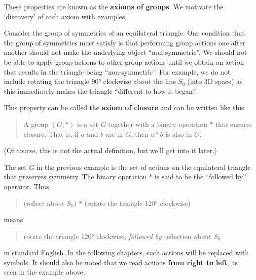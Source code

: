 These properties are known as the \textbf{axioms of groups}. We motivate the `discovery' of each axiom with examples.

\begin{figure}
    \centering
\end{figure}

Consider the group of symmetries of an equilateral triangle. One condition that the group of symmetries must satisfy is that performing group actions one after another should not make the underlying object ``non-symmetric''. We should not be able to apply group actions to other group actions until we obtain an action that results in the triangle being ``non-symmetric''. For example, we do not include rotating the triangle 90° clockwise about the line $S_0$ (into 3D space) as this immediately makes the triangle ``different to how it began''.

This property can be called the \textbf{axiom of closure} and can be written like this:
\begin{quote}
    A group $(G, \ast)$ is a set $G$ together with a binary operation $\ast$ that ensures closure. That is, if $a$ and $b$ are in $G$, then $a \ast b$ is also in $G$.
\end{quote}
(Of course, this is not the actual definition, but we'll get into it later.)

\newpage

The set $G$ in the previous example is the set of actions on the equilateral triangle that preserves symmetry. The binary operation $\ast$ is said to be the ``followed by'' operator. Thus
\begin{quote}
    (reflect about $S_0$) $\ast$ (rotate the triangle 120° clockwise)
\end{quote}
means
\begin{quote}
    rotate the triangle 120° clockwise, \textit{followed by} reflection about $S_0$
\end{quote}
in standard English. In the following chapters, such actions will be replaced with symbols. It should also be noted that we read actions \textbf{from right to left}, as seen in the example above.

